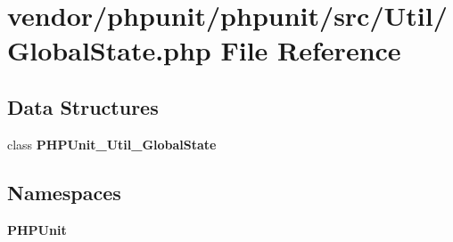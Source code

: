 \section{vendor/phpunit/phpunit/src/\+Util/\+Global\+State.php File Reference}
\label{_global_state_8php}
\subsection*{Data Structures}
\begin{DoxyCompactItemize}
\item 
class {\bf P\+H\+P\+Unit\+\_\+\+Util\+\_\+\+Global\+State}
\end{DoxyCompactItemize}
\subsection*{Namespaces}
\begin{DoxyCompactItemize}
\item 
 {\bf P\+H\+P\+Unit}
\end{DoxyCompactItemize}
